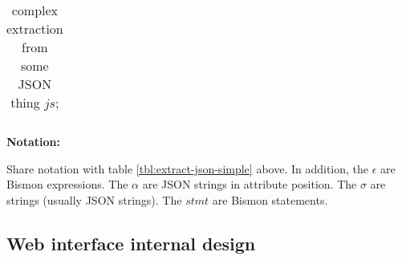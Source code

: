\begin{table}
\begin{relsize}{-1.3}
\begin{center}
\begin{tabular}{lcp{6.4cm}}
    \end{tabular}
  \end{center}
  \bigskip
  \textbf{Notation:} \hspace{0.6em} \begin{minipage}{0.9\textwidth}
    Share notation with table \ref{tbl:extract-json-simple} above. In
    addition, the $\epsilon$ are Bismon expressions. The $\alpha$ are
    JSON strings in attribute position. The $\sigma$ are strings
    (usually JSON strings). The $\mathit{stmt}$ are Bismon statements.
  \end{minipage}
  \end{relsize}
  \caption{complex extraction from some JSON thing $\mathit{js}$;
    {}
    }
  \label{tbl:extract-json-complex}
  \end{table}



\subsection{Web interface internal design}
\label{subsec:webinterf}

